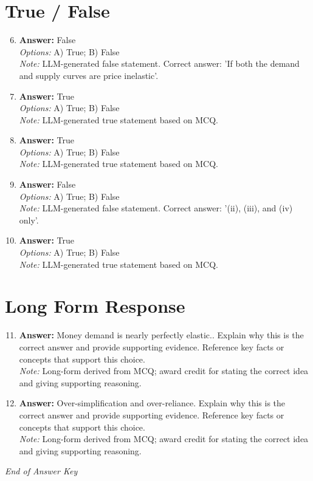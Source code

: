 \documentclass[12pt]{article}
\begin{document}
\section*{True / False}
\begin{enumerate}[label=\arabic*.]
\setcounter{enumi}{5}
\item \textbf{Answer:} False
\\ \textit{Options:} A) True; B) False
\\ \textit{Note:} LLM-generated false statement. Correct answer: 'If both the demand and supply curves are price inelastic'.
\item \textbf{Answer:} True
\\ \textit{Options:} A) True; B) False
\\ \textit{Note:} LLM-generated true statement based on MCQ.
\item \textbf{Answer:} True
\\ \textit{Options:} A) True; B) False
\\ \textit{Note:} LLM-generated true statement based on MCQ.
\item \textbf{Answer:} False
\\ \textit{Options:} A) True; B) False
\\ \textit{Note:} LLM-generated false statement. Correct answer: '(ii), (iii), and (iv) only'.
\item \textbf{Answer:} True
\\ \textit{Options:} A) True; B) False
\\ \textit{Note:} LLM-generated true statement based on MCQ.
\end{enumerate}

\section*{Long Form Response}
\begin{enumerate}[label=\arabic*.]
\setcounter{enumi}{10}
\item \textbf{Answer:} Money demand is nearly perfectly elastic.. Explain why this is the correct answer and provide supporting evidence. Reference key facts or concepts that support this choice.
\\ \textit{Note:} Long-form derived from MCQ; award credit for stating the correct idea and giving supporting reasoning.
\item \textbf{Answer:} Over-simplification and over-reliance. Explain why this is the correct answer and provide supporting evidence. Reference key facts or concepts that support this choice.
\\ \textit{Note:} Long-form derived from MCQ; award credit for stating the correct idea and giving supporting reasoning.
\end{enumerate}

\vfill
\noindent\textit{End of Answer Key}
\end{document}
